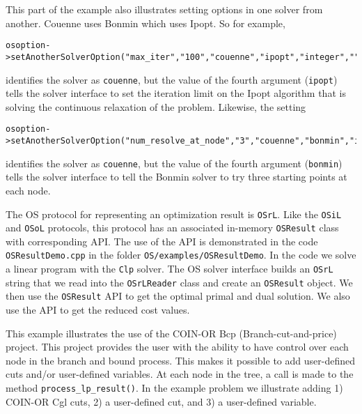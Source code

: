This part of the example also illustrates setting options in one solver from another. 
Couenne uses Bonmin which uses Ipopt.  So for example,

\begin{verbatim}
osoption->setAnotherSolverOption("max_iter","100","couenne","ipopt","integer","");
\end{verbatim}
identifies the solver as {\tt couenne}, but the value of the fourth argument ({\tt ipopt})  tells the solver 
interface to set the iteration limit on the Ipopt algorithm that is solving the continuous relaxation 
of the problem.  Likewise, the setting
\begin{verbatim}
osoption->setAnotherSolverOption("num_resolve_at_node","3","couenne","bonmin","integer","");
\end{verbatim}
identifies the solver as {\tt couenne}, but the value of the fourth argument ({\tt bonmin})  tells the solver 
interface to tell the Bonmin solver to try three starting points at each node. 

 

\label{section:exampleOSResultDemo}

The OS protocol for representing an optimization result is {\tt OSrL}. Like the {\tt OSiL} and {\tt OSoL} protocols, this protocol has an associated in-memory {\tt OSResult} class with corresponding API.  The use of the API is demonstrated in the code {\tt OSResultDemo.cpp} in the folder {\tt OS/examples/OSResultDemo}.  In the code we solve a linear program with the {\tt Clp} solver.  The OS solver interface builds an {\tt OSrL} string that we read into the {\tt OSrLReader} class and create an {\tt OSResult} object. We then use the {\tt OSResult} API to get the optimal primal and dual solution. We also use the API to get the reduced cost values. 


\label{section:examplebranchCutPrice}

This example illustrates the use of the COIN-OR Bcp (Branch-cut-and-price) project.  
This project provides the user with the ability to have control over each node 
in the branch and bound process. 
This makes it possible to add user-defined cuts and/or user-defined variables. At each node in the tree, 
a call is made to the method {\tt process\_lp\_result()}. In the example problem we illustrate adding 
1)  COIN-OR Cgl cuts, 2) a user-defined cut, and 3) a user-defined variable. 


